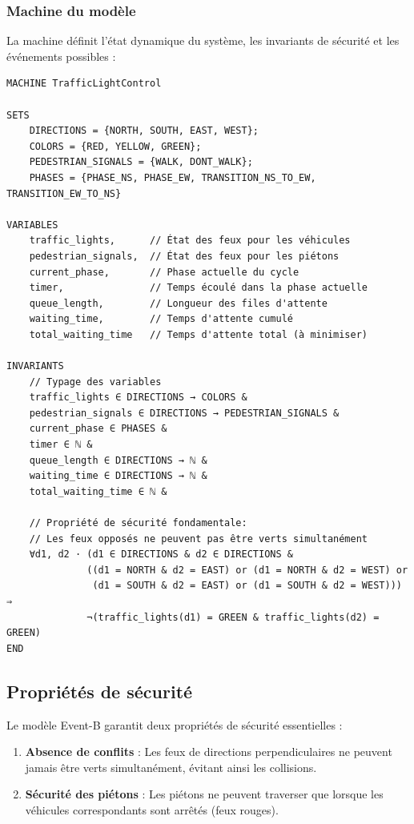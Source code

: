 \subsubsection{Machine du modèle}
\label{subsubsec:machine}

La machine définit l'état dynamique du système, les invariants de sécurité et les événements possibles :

\begin{lstlisting}[style=EventB, caption=Extrait de la machine Event-B]
MACHINE TrafficLightControl

SETS
    DIRECTIONS = {NORTH, SOUTH, EAST, WEST};
    COLORS = {RED, YELLOW, GREEN};
    PEDESTRIAN_SIGNALS = {WALK, DONT_WALK};
    PHASES = {PHASE_NS, PHASE_EW, TRANSITION_NS_TO_EW, TRANSITION_EW_TO_NS}

VARIABLES
    traffic_lights,      // État des feux pour les véhicules
    pedestrian_signals,  // État des feux pour les piétons
    current_phase,       // Phase actuelle du cycle
    timer,               // Temps écoulé dans la phase actuelle
    queue_length,        // Longueur des files d'attente
    waiting_time,        // Temps d'attente cumulé
    total_waiting_time   // Temps d'attente total (à minimiser)

INVARIANTS
    // Typage des variables
    traffic_lights ∈ DIRECTIONS → COLORS &
    pedestrian_signals ∈ DIRECTIONS → PEDESTRIAN_SIGNALS &
    current_phase ∈ PHASES &
    timer ∈ ℕ &
    queue_length ∈ DIRECTIONS → ℕ &
    waiting_time ∈ DIRECTIONS → ℕ &
    total_waiting_time ∈ ℕ &
    
    // Propriété de sécurité fondamentale:
    // Les feux opposés ne peuvent pas être verts simultanément
    ∀d1, d2 · (d1 ∈ DIRECTIONS & d2 ∈ DIRECTIONS & 
              ((d1 = NORTH & d2 = EAST) or (d1 = NORTH & d2 = WEST) or
               (d1 = SOUTH & d2 = EAST) or (d1 = SOUTH & d2 = WEST))) ⇒
              ¬(traffic_lights(d1) = GREEN & traffic_lights(d2) = GREEN)
END
\end{lstlisting}

\subsection{Propriétés de sécurité}
\label{subsec:securite}

Le modèle Event-B garantit deux propriétés de sécurité essentielles :

\begin{enumerate}
    \item \textbf{Absence de conflits} : Les feux de directions perpendiculaires ne peuvent jamais être verts simultanément, évitant ainsi les collisions.
    \item \textbf{Sécurité des piétons} : Les piétons ne peuvent traverser que lorsque les véhicules correspondants sont arrêtés (feux rouges).
\end{enumerate}

